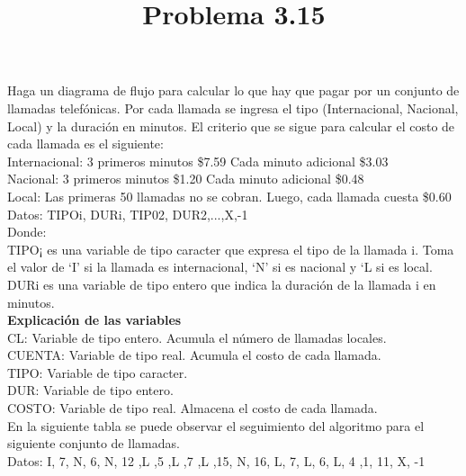 \documentclass[11pt]{amsart}
\title{Problema 3.15}
\author{}
\begin{document}
\maketitle
Haga un diagrama de flujo para calcular lo que hay que pagar por un conjunto de llamadas telefónicas. Por cada llamada se ingresa el tipo (Internacional, Nacional, Local) y la duración en minutos. El criterio que se sigue para calcular el costo de cada llamada es el siguiente: \\

\indent Internacional: 3 primeros minutos \$7.59 Cada minuto adicional \$3.03 \\

\indent Nacional: 3 primeros minutos \$1.20 Cada minuto adicional \$0.48 \\

\indent Local: Las primeras 50 llamadas no se cobran. Luego, cada llamada cuesta \$0.60 \\

Datos: TIPOi, DURi, TIP02, DUR2,...,X,-1 \\ 

Donde: \\
	\indent TIPO¡ es una variable de tipo caracter que expresa el tipo de la llamada i. 
     Toma el valor de ‘I’ si la llamada es internacional, ‘N’ si es nacional y ‘L si es local. \\

	\indent DURi es una variable de tipo entero que indica la duración de la llamada i en minutos.\\
	
\textbf{Explicación de las variables}\\
CL: Variable de tipo entero. Acumula el número de llamadas locales.\\
CUENTA: Variable de tipo real. Acumula el costo de cada llamada.\\
TIPO: Variable de tipo caracter.\\
DUR: Variable de tipo entero.\\
COSTO: Variable de tipo real. Almacena el costo de cada llamada.\\
En la siguiente tabla se puede observar el seguimiento del algoritmo para el
siguiente conjunto de llamadas.\\
Datos: I, 7, N, 6, N, 12 ,L ,5 ,L ,7 ,L ,15, N, 16, L, 7, L, 6, L, 4 ,1, 11, X, -1\\  
\end{document}
